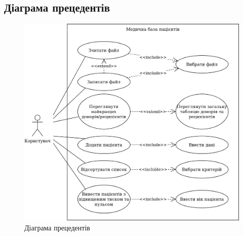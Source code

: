 \documentclass[oneside,14pt]{extarticle}
\begin{document}
\subsection{Діаграма прецедентів}
\begin{figure}[H]
	\centering
	\includegraphics[scale=0.4]{2}
	\caption{Діаграма прецедентів}
\end{figure}
\end{document}
